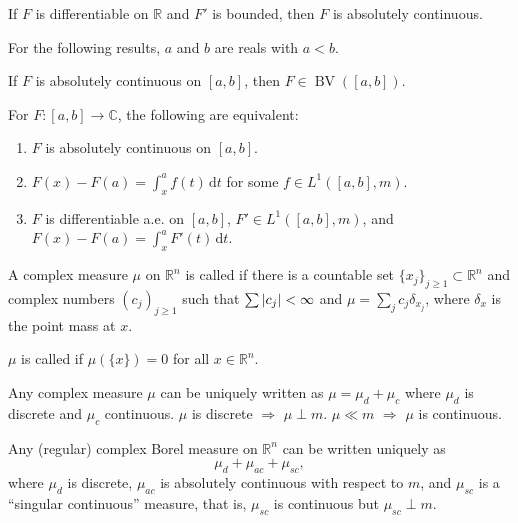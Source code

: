 \documentclass[12pt]{article}	%
\DeclareMathOperator{\BV}{BV}
\begin{document}
If $F$ is differentiable on $\mathbb{R}$ and $F'$ is bounded, then $F$ is absolutely continuous.

For the following results, $a$ and $b$ are reals with $a < b$.

\begin{prop}
	If $F$ is absolutely continuous on $[a, b]$, then $F \in \BV([a, b])$.
\end{prop}

\begin{thm}
	For $F : [a, b] \to \mathbb{C}$, the following are equivalent:
	\begin{enumerate}
		\item $F$ is absolutely continuous on $[a, b]$.
		\item $F(x) - F(a) = \int_{x}^{a} f(t) \,{\mathrm{d}}t$ for some $f \in L^{1}([a, b], m)$.
		\item $F$ is differentiable a.e. on $[a, b]$, $F' \in L^{1}([a, b], m)$, and $F(x) - F(a) = \int_{x}^{a} F'(t) \,{\mathrm{d}}t$.
	\end{enumerate}
\end{thm}

\begin{defn}
	A complex measure $\mu$ on $\mathbb{R}^{n}$ is called  if there is a countable set $\{x_{j}\}_{j \ge 1} \subset \mathbb{R}^{n}$ and complex numbers $(c_{j})_{j \ge 1}$ such that $\sum {\left\lvert c_{j} \right\lvert} < \infty$ and $\mu = \sum_{j} c_{j} \delta_{x_{j}}$, where $\delta_{x}$ is the point mass at $x$.

	$\mu$ is called  if $\mu(\{x\}) = 0$ for all $x \in \mathbb{R}^{n}$.
\end{defn}

Any complex measure $\mu$ can be uniquely written as $\mu = \mu_{d} + \mu_{c}$ where $\mu_{d}$ is discrete and $\mu_{c}$ continuous. \newline
$\mu$ is discrete $\Rightarrow$ $\mu \perp m$. \newline
$\mu \ll m$ $\Rightarrow$ $\mu$ is continuous.

Any (regular) complex Borel measure on $\mathbb{R}^{n}$ can be written uniquely as
\begin{equation*} 
	\mu_{d} + \mu_{ac} + \mu_{sc},
\end{equation*}
where $\mu_{d}$ is discrete, $\mu_{ac}$ is absolutely continuous with respect to $m$, and $\mu_{sc}$ is a ``singular continuous'' measure, that is, $\mu_{sc}$ is continuous but $\mu_{sc} \perp m$.
\end{document}
